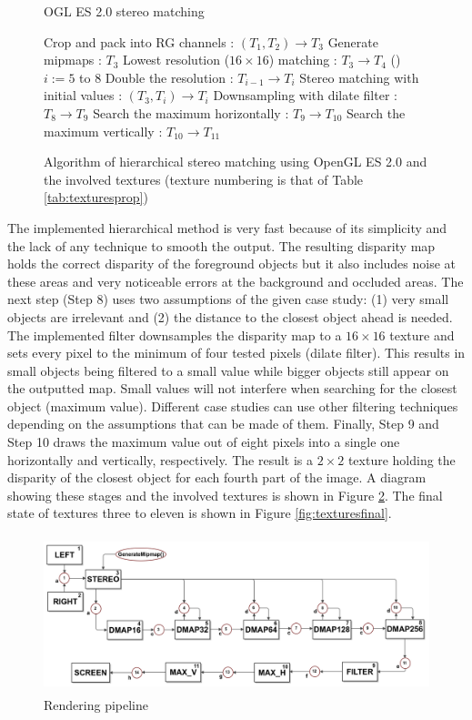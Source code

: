 \documentclass[conference]{IEEEtran}
\makeatletter
\newcommand{\removelatexerror}{\let\@latex@error\@gobble}
\makeatother
\begin{document}
\begin{figure}[!t]
 \removelatexerror
 \begin{algorithm}[H]
 \caption{OGL ES 2.0 stereo matching}
	Crop and pack into RG channels : $(T_1, T_2)\rightarrow T_3$\;
	Generate mipmaps : $T_3$\;
	Lowest resolution ($16\times16$) matching : $T_3 \rightarrow T_4$\;
	\For(){$i := 5$ to $8$}
	{
		Double the resolution : $T_{i-1} \rightarrow T_i $\;
		Stereo matching with initial values : $(T_3, T_{i}) \rightarrow T_i$\;
	}
	Downsampling with dilate filter : $T_8 \rightarrow T_9$\;
	Search the maximum horizontally : $T_9 \rightarrow T_{10}$\;
	Search the maximum vertically : $T_{10} \rightarrow T_{11}$\;
 \end{algorithm}
 \caption{Algorithm of hierarchical stereo matching using OpenGL ES 2.0 and the involved textures (texture numbering is that of Table \ref{tab:texturesprop})}
 \label{fig:alg:loop}
\end{figure}

The implemented hierarchical method is very fast because of its simplicity and the lack of any technique to smooth the output. The resulting disparity map holds the correct disparity of the foreground objects but it also includes noise at these areas and very noticeable errors at the background and occluded areas. The next step (Step 8) uses two assumptions of the given case study: (1) very small objects are irrelevant and (2) the distance to the closest object ahead is needed. The implemented filter downsamples the disparity map to a $16 \times 16$ texture and sets every pixel to the minimum of four tested pixels (dilate filter). This results in small objects being filtered to a small value while bigger objects still appear on the outputted map. Small values will not interfere when searching for the closest object (maximum value). Different case studies can use other filtering techniques depending on the assumptions that can be made of them. Finally, Step 9 and Step 10 draws the maximum value out of eight pixels into a single one horizontally and vertically, respectively. The result is a $2 \times 2$ texture holding the disparity of the closest object for each fourth part of the image. A diagram showing these stages and the involved textures is shown in Figure \ref{fig:pipeline}. The final state of textures three to eleven is shown in Figure \ref{fig:texturesfinal}.

\begin{figure}[!t]
 \centering
 \includegraphics[height=1.8in, width=6.5in]{pipeline}
 \caption{Rendering pipeline}
 \label{fig:pipeline}
\end{figure}
\end{document}
